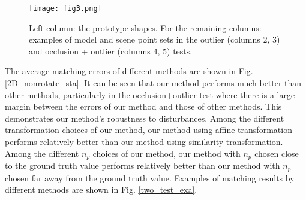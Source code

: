 \documentclass[11pt,bezier,]{article}
\begin{document}
\begin{figure}[ht]
\centering
\texttt{[image: fig3.png]}


% 
\caption{
Left column: the prototype shapes.
For the remaining columns:
examples of model and scene point sets in the %
outlier (columns 2, 3) and occlusion + outlier (columns 4, 5) tests. 
\label{nonrot_2D_test_data_exa}}
\end{figure}


The average matching errors of different methods
are shown in Fig. \ref{2D_nonrotate_sta}.
It can be seen that our method performs much better than other methods,
particularly in the occlusion+outlier test
where there is a large margin between the errors of our method and those of other methods.
This demonstrates our method's robustness to disturbances.
Among the different transformation choices of our method,
our method using affine transformation performs relatively better than our method using similarity transformation.
Among the different $n_p$ choices of our method,
our method with $n_p$ chosen close to the ground truth value performs relatively better than
our method with $n_p$ chosen far away from the ground truth value.
Examples of matching results by different methods are shown in Fig. \ref{two_test_exa}. 
\end{document}

